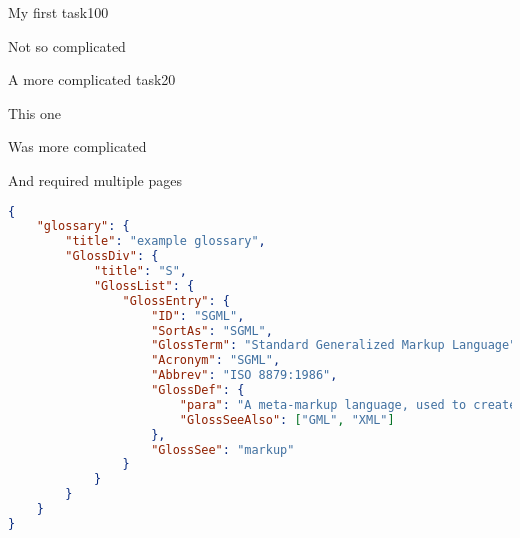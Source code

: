 \begin{task}{My first task}{100}

Not so complicated 

\end{task}

\begin{task}{A more complicated task}{20}

This one

\pagebreak

Was more complicated 

\pagebreak

And required multiple pages
\end{task}



\begin{frame}[containsverbatim]
	\begin{lstlisting}[language=json,firstnumber=1,basicstyle=\tiny]
{
    "glossary": {
        "title": "example glossary",
		"GlossDiv": {
            "title": "S",
			"GlossList": {
                "GlossEntry": {
                    "ID": "SGML",
					"SortAs": "SGML",
					"GlossTerm": "Standard Generalized Markup Language",
					"Acronym": "SGML",
					"Abbrev": "ISO 8879:1986",
					"GlossDef": {
                        "para": "A meta-markup language, used to create markup languages such as DocBook.",
						"GlossSeeAlso": ["GML", "XML"]
                    },
					"GlossSee": "markup"
                }
            }
        }
    }
}
	\end{lstlisting}		
	\end{frame}

